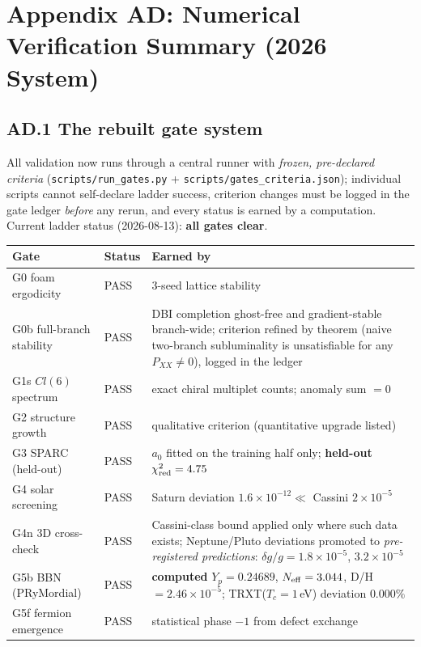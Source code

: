 \section{Appendix AD: Numerical Verification Summary (2026 System)}
\label{app:AD}

\subsection*{AD.1 The rebuilt gate system}
All validation now runs through a central runner with \emph{frozen, pre-declared criteria}
(\texttt{scripts/run\_gates.py} + \texttt{scripts/\allowbreak gates\_\allowbreak criteria.json}); individual scripts
cannot self-declare ladder success, criterion changes must be logged in the gate ledger
\emph{before} any rerun, and every status is earned by a computation. Current ladder status
(2026-08-13): \textbf{all gates clear}.

\begin{center}
\begin{tabular}{llp{}}
\toprule
Gate & Status & Earned by \\
\midrule
G0 foam ergodicity & PASS & 3-seed lattice stability \\
G0b full-branch stability & PASS & DBI completion ghost-free and gradient-stable branch-wide; criterion refined by theorem (naive two-branch subluminality is unsatisfiable for any $P_{XX}\neq0$), logged in the ledger \\
G1s $Cl(6)$ spectrum & PASS & exact chiral multiplet counts; anomaly sum $=0$ \\
G2 structure growth & PASS & qualitative criterion (quantitative upgrade listed) \\
G3 SPARC (held-out) & PASS & $a_0$ fitted on the training half only; \textbf{held-out} $\chi^2_{\rm red}=4.75$ \\
G4 solar screening & PASS & Saturn deviation $1.6\times10^{-12}\ll$ Cassini $2\times10^{-5}$ \\
G4n 3D cross-check & PASS & Cassini-class bound applied only where such data exists; Neptune/Pluto deviations promoted to \emph{pre-registered predictions}: $\delta g/g = 1.8\times10^{-5}$, $3.2\times10^{-5}$ \\
G5b BBN (PRyMordial) & PASS & \textbf{computed} $Y_p = 0.24689$, $N_{\rm eff}=3.044$, D/H $=2.46\times10^{-5}$; TRXT($T_c{=}1$\,eV) deviation $0.000\%$ \\
G5f fermion emergence & PASS & statistical phase $-1$ from defect exchange \\
\bottomrule
\end{tabular}
\end{center}

